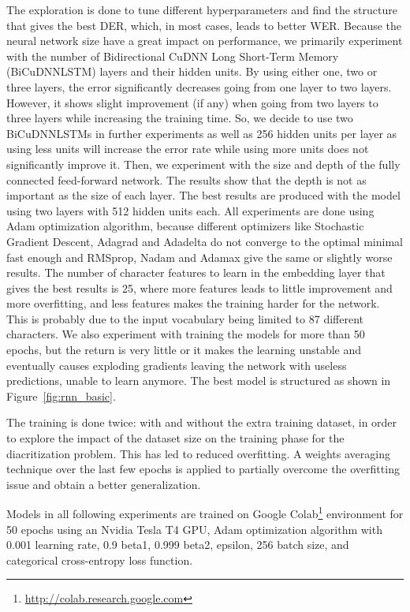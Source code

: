 \documentclass[11pt,a4paper]{article}
\begin{document}
The exploration is done to tune different hyperparameters and find the structure that gives the best DER, which, in most cases, leads to better WER. Because the neural network size have a great impact on performance, we primarily experiment with the number of Bidirectional CuDNN Long Short-Term Memory (BiCuDNNLSTM) \cite{appleyard2016optimizing} layers and their hidden units. By using either one, two or three layers, the error significantly decreases going from one layer to two layers. However, it shows slight improvement (if any) when going from two layers to three layers while increasing the training time. So, we decide to use two BiCuDNNLSTMs in further experiments as well as 256 hidden units per layer as using less units will increase the error rate while using more units does not significantly improve it.
Then, we experiment with the size and depth of the fully connected feed-forward network. The results show that the depth is not as important as the size of each layer. The best results are produced with the model using two layers with 512 hidden units each.
All experiments are done using Adam optimization algorithm, because different optimizers like Stochastic Gradient Descent, Adagrad and Adadelta do not converge to the optimal minimal fast enough and RMSprop, Nadam and Adamax give the same or slightly worse results.
The number of character features to learn in the embedding layer that gives the best results is 25, where more features leads to little improvement and more overfitting, and less features makes the training harder for the network. This is probably due to the input vocabulary being limited to 87 different characters.
We also experiment with training the models for more than 50 epochs, but the return is very little or it makes the learning unstable and eventually causes exploding gradients leaving the network with useless predictions, unable to learn anymore.
The best model is structured as shown in
Figure~\ref{fig:rnn_basic}.

The training is done twice: with and without the extra training dataset, in order to explore the impact of the dataset size on the training phase for the diacritization problem. This has led to reduced overfitting. A weights averaging technique over the last few epochs is applied to partially overcome the overfitting issue and obtain a better generalization.

Models in all following experiments are trained on Google Colab\footnote{\url{http://colab.research.google.com}} \cite{carneiro2018performance} environment for 50 epochs using an Nvidia Tesla T4 GPU, Adam  optimization algorithm with 0.001 learning rate, 0.9 beta1, 0.999 beta2,  epsilon, 256 batch size, and categorical cross-entropy loss function.
\end{document}
